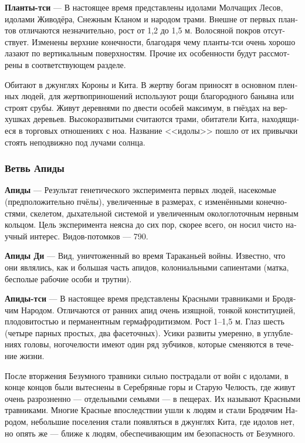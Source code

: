 \documentclass[a4paper,12pt,fleqn]{book}\usepackage{polyglossia}\setdefaultlanguage[babelshorthands=true]{russian}\setotherlanguage{english}\defaultfontfeatures{Ligatures=TeX,Mapping=tex-text}\usepackage{xcolor}\newcommand{\ml}[3]{#2}
\newcommand{\asterism}{\vspace{1em}{\centering\Large\bfseries$\ast~\ast~\ast$\par}\vspace{1em}}
\newcommand{\theterm}[3]{\textbf{\hypertarget{#1}{#2}} --- #3}
\begin{document}
\theterm{qi-plants}
{Планты-тси}
{В настоящее время представлены идолами Молчащих Лесов, идолами Живодёра, Снежным Кланом и народом трами.
Внешне от первых плантов отличаются незначительно, рост от 1,2 до 1,5 м.
Волосяной покров отсутствует.
Изменены верхние конечности, благодаря чему планты-тси очень хорошо лазают по вертикальным поверхностям.
Прочие их особенности будут рассмотрены в соответствующем разделе.

Обитают в джунглях Короны и Кита.
В жертву богам приносят в основном пленных людей, для жертвоприношений используют рощи благородного баньяна или строят срубы.
Живут деревнями по двести особей максимум, в гнёздах на верхушках деревьев.
Высокоразвитыми считаются трами, обитатели Кита, находящиеся в торговых отношениях с ноа.
Название <<идолы>> пошло от их привычки стоять неподвижно под лучами солнца.}

\subsubsection{Ветвь Апиды}

\theterm{apis-fork}
{Апиды}
{Результат генетического эксперимента первых людей, насекомые (предположительно пчёлы), увеличенные в размерах, с изменёнными конечностями, скелетом, дыхательной системой и увеличенным окологлоточным нервным кольцом.
Цель эксперимента неясна до сих пор, скорее всего, он носил чисто научный интерес.
Видов-потомков --- 790.}

\asterism

\theterm{di-apis}
{Апиды Ди}
{Вид, уничтоженный во время Тараканьей войны.
Известно, что они являлись, как и большая часть апидов, колониальными сапиентами (матка, бесполые рабочие особи и трутни).}

\theterm{qi-apis}
{Апиды-тси}
{В настоящее время представлены Красными травниками и Бродячим Народом.
Отличаются от ранних апид очень изящной, тонкой конституцией, плодовитостью и перманентным гермафродитизмом.
Рост 1--1,5 м.
Глаз шесть (четыре парных простых, два фасеточных).
Усики развиты умеренно, в углублениях головы, ногочелюсти имеют один ряд зубчиков, которые сменяются в течение жизни.

После вторжения Безумного травники сильно пострадали от войн с идолами, в конце концов были вытеснены в Серебряные горы и Старую Челюсть, где живут очень разрозненно --- отдельными семьями --- в пещерах.
Их называют Красными травниками.
Многие Красные впоследствии ушли к людям и стали Бродячим Народом, небольшие поселения стали появляться в джунглях Кита, где идолов нет, но опять же --- ближе к людям, обеспечивающим им безопасность от Безумного.}
\end{document}
